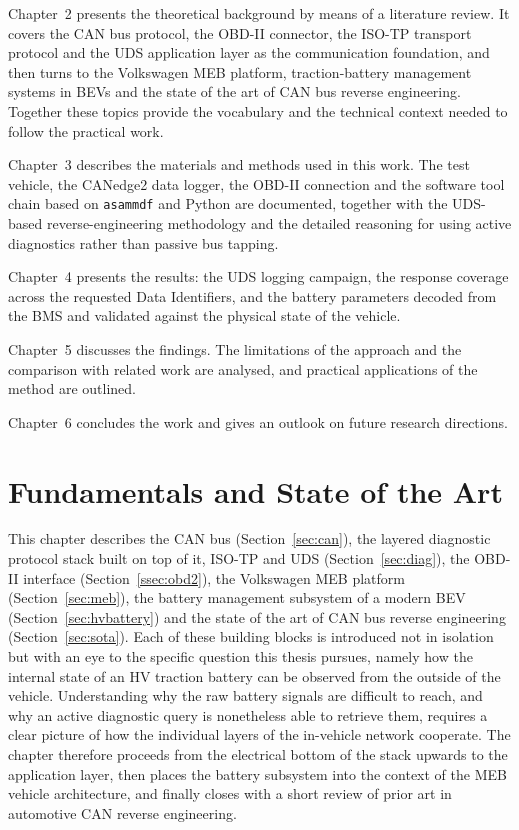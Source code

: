\documentclass[11pt,a4paper,oneside,parskip=half]{scrreprt}
\begin{document}
Chapter~2 presents the theoretical background by means of a literature review. It covers the CAN bus protocol, the OBD-II connector, the ISO-TP transport protocol and the UDS application layer as the communication foundation, and then turns to the Volkswagen MEB platform, traction-battery management systems in BEVs and the state of the art of CAN bus reverse engineering. Together these topics provide the vocabulary and the technical context needed to follow the practical work.

Chapter~3 describes the materials and methods used in this work. The test vehicle, the CANedge2 data logger, the OBD-II connection and the software tool chain based on \texttt{asammdf} and Python are documented, together with the UDS-based reverse-engineering methodology and the detailed reasoning for using active diagnostics rather than passive bus tapping.

Chapter~4 presents the results: the UDS logging campaign, the response coverage across the requested Data Identifiers, and the battery parameters decoded from the BMS and validated against the physical state of the vehicle.

Chapter~5 discusses the findings. The limitations of the approach and the comparison with related work are analysed, and practical applications of the method are outlined.

Chapter~6 concludes the work and gives an outlook on future research directions.


\chapter{Fundamentals and State of the Art}
This chapter describes the CAN bus (Section~\ref{sec:can}), the layered diagnostic protocol stack built on top of it, ISO-TP and UDS (Section~\ref{sec:diag}), the OBD-II interface (Section~\ref{ssec:obd2}), the Volkswagen MEB platform (Section~\ref{sec:meb}), the battery management subsystem of a modern BEV (Section~\ref{sec:hvbattery}) and the state of the art of CAN bus reverse engineering (Section~\ref{sec:sota}). Each of these building blocks is introduced not in isolation but with an eye to the specific question this thesis pursues, namely how the internal state of an HV traction battery can be observed from the outside of the vehicle. Understanding why the raw battery signals are difficult to reach, and why an active diagnostic query is nonetheless able to retrieve them, requires a clear picture of how the individual layers of the in-vehicle network cooperate. The chapter therefore proceeds from the electrical bottom of the stack upwards to the application layer, then places the battery subsystem into the context of the MEB vehicle architecture, and finally closes with a short review of prior art in automotive CAN reverse engineering.
\end{document}
